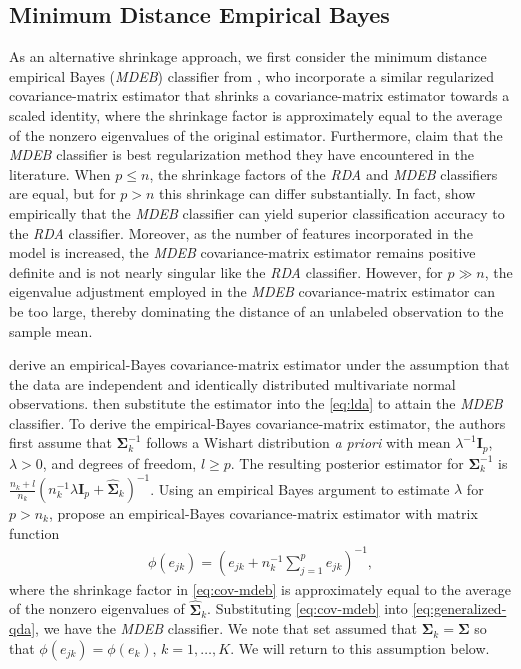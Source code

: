 \documentclass[11pt]{article}
\begin{document}
\subsection{Minimum Distance Empirical Bayes}

As an alternative shrinkage approach, we first consider the minimum distance empirical Bayes (\emph{MDEB}) classifier from \cite{Srivastava:2007ww}, who incorporate a similar regularized covariance-matrix estimator that shrinks a covariance-matrix estimator towards a scaled identity, where the shrinkage factor is approximately equal to the average of the nonzero eigenvalues of the original estimator. Furthermore, \cite{Srivastava:2007ww} claim that the \emph{MDEB} classifier is best regularization method they have encountered in the literature. When $p \le n$, the shrinkage factors of the \emph{RDA} and \emph{MDEB} classifiers are equal, but for $p > n$ this shrinkage can differ substantially. In fact, \cite{Ramey:2011ji} show empirically that the \emph{MDEB} classifier can yield superior classification accuracy to the \emph{RDA} classifier. Moreover, as the number of features incorporated in the model is increased, the \emph{MDEB} covariance-matrix estimator remains positive definite and is not nearly singular like the \emph{RDA} classifier. However, for $p \gg n$, the eigenvalue adjustment employed in the \emph{MDEB} covariance-matrix estimator can be too large, thereby dominating the distance of an unlabeled observation to the sample mean.

\cite{Srivastava:2007ww} derive an empirical-Bayes covariance-matrix estimator under the assumption that the data are independent and identically distributed multivariate normal observations. \cite{Srivastava:2007ww} then substitute the estimator into the \eqref{eq:lda} to attain the \emph{MDEB} classifier. To derive the empirical-Bayes covariance-matrix estimator, the authors first assume that $\bm \Sigma_k^{-1}$ follows a Wishart distribution \emph{a priori} with mean $\lambda^{-1} \bm I_p$, $\lambda > 0$, and degrees of freedom, $l \ge p$. The resulting posterior estimator for $\bm \Sigma_k^{-1}$ is $\frac{n_k + l}{n_k}(n_k^{-1}\lambda \bm I_p + \widehat{\bm \Sigma}_k)^{-1}$. Using an empirical Bayes argument to estimate $\lambda$ for $p > n_k$, \cite{Srivastava:2007ww} propose an empirical-Bayes covariance-matrix estimator with matrix function
\begin{align}
	\phi(e_{jk}) = \left(e_{jk} + n_k^{-1} \sum_{j = 1}^p e_{jk}\right)^{-1},\label{eq:cov-mdeb}
\end{align}
where the shrinkage factor in \eqref{eq:cov-mdeb} is approximately equal to the average of the nonzero eigenvalues of $\widehat{\bm \Sigma}_k$. Substituting \eqref{eq:cov-mdeb} into \eqref{eq:generalized-qda}, we have the \emph{MDEB} classifier. We note that \cite{Srivastava:2007ww} set assumed that $\bm \Sigma_k = \bm \Sigma$ so that $\phi(e_{jk}) = \phi(e_k)$, $k = 1, \ldots, K$. We will return to this assumption below.
\end{document}
